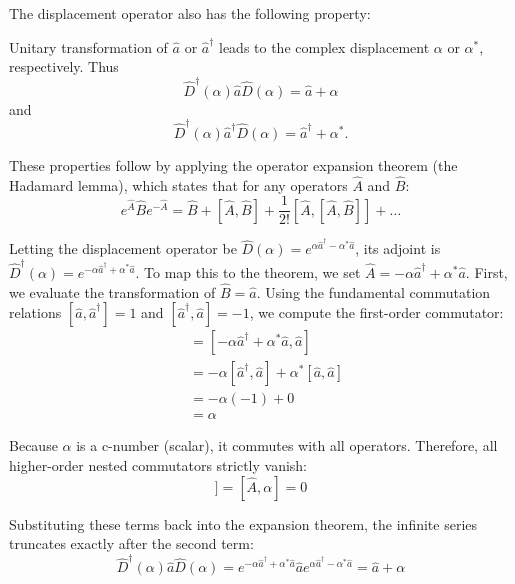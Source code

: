 The displacement operator also has the following property:

{Unitary transformation of $\hat{a}$ or $\hat{a}^{\dagger}$ leads to the complex displacement $\alpha$ or $\alpha^{*}$, respectively. Thus
\begin{equation*} \hat{D}^{\dagger}(\alpha)\hat{a}\hat{D}(\alpha)=\hat{a}+\alpha \end{equation*}
and
\begin{equation*} \hat{D}^{\dagger}(\alpha)\hat{a}^{\dagger}\hat{D}(\alpha)=\hat{a}^{\dagger}+\alpha^{*}. \end{equation*} }

{These properties follow by applying the operator expansion theorem (the Hadamard lemma), which states that for any operators $\hat{A}$ and $\hat{B}$:}
\begin{equation*} e^{\hat{A}}\hat{B}e^{-\hat{A}} = \hat{B} + [\hat{A},\hat{B}] + \frac{1}{2!}[\hat{A},[\hat{A},\hat{B}]] + \dots \end{equation*}

{Letting the displacement operator be $\hat{D}(\alpha) = e^{\alpha\hat{a}^{\dagger}-\alpha^{*}\hat{a}}$, its adjoint is $\hat{D}^{\dagger}(\alpha) = e^{-\alpha\hat{a}^{\dagger}+\alpha^{*}\hat{a}}$. To map this to the theorem, we set $\hat{A} = -\alpha\hat{a}^{\dagger}+\alpha^{*}\hat{a}$. First, we evaluate the transformation of $\hat{B} = \hat{a}$. Using the fundamental commutation relations $[\hat{a},\hat{a}^{\dagger}]=1$ and $[\hat{a}^{\dagger},\hat{a}]=-1$, we compute the first-order commutator:}
\begin{align*}
[\hat{A},\hat{a}] &= [-\alpha\hat{a}^{\dagger}+\alpha^{*}\hat{a}, \hat{a}] \\
&= -\alpha[\hat{a}^{\dagger},\hat{a}] + \alpha^{*}[\hat{a},\hat{a}] \\
&= -\alpha(-1) + 0 \\
&= \alpha
\end{align*}

{Because $\alpha$ is a c-number (scalar), it commutes with all operators. Therefore, all higher-order nested commutators strictly vanish:}
\begin{equation*} [\hat{A},[\hat{A},\hat{a}]] = [\hat{A},\alpha] = 0 \end{equation*}

{Substituting these terms back into the expansion theorem, the infinite series truncates exactly after the second term:}
\begin{equation*} \hat{D}^{\dagger}(\alpha)\hat{a}\hat{D}(\alpha) = e^{-\alpha\hat{a}^{\dagger}+\alpha^{*}\hat{a}}\hat{a}e^{\alpha\hat{a}^{\dagger}-\alpha^{*}\hat{a}} = \hat{a} + \alpha \end{equation*}

